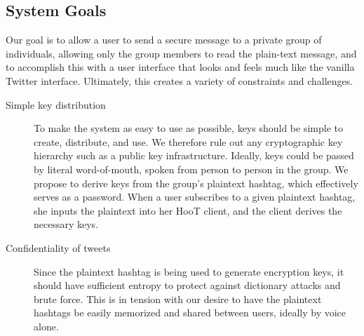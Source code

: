 \subsection{System Goals} \label{sec:goals}
Our goal is to allow a user to send a secure message to a private group
of individuals, allowing only the group members to read the plain-text
message, and to accomplish this with a user interface that looks and
feels much like the vanilla Twitter interface. Ultimately, this creates
a variety of constraints and challenges.

\begin{description}

\item[Simple key distribution] To make the system as easy to use as
  possible, keys should be simple to create, distribute, and use. We
  therefore rule out any cryptographic key hierarchy such as a public
  key infrastructure. Ideally, keys could be passed by literal
  word-of-mouth, spoken from person to person in the group. We propose
  to derive keys from the group's plaintext hashtag, which effectively
  serves as a password. When a user subscribes to a given plaintext
  hashtag, she inputs the plaintext into her HooT client, and the client
  derives the necessary keys.

\item[Confidentiality of tweets] Since the plaintext hashtag is being
  used to generate encryption keys, it should have sufficient entropy to
  protect against dictionary attacks and brute force. This is in tension
  with our desire to have the plaintext hashtags be easily memorized and
  shared between users, ideally by voice alone.


\end{description}
